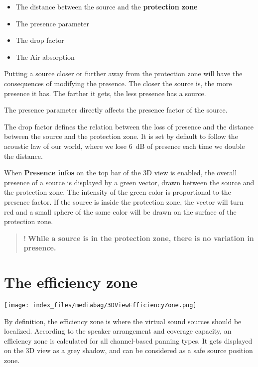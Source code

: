 \documentclass[
  letterpaper,
  DIV=11,
  numbers=noendperiod]{scrreport}
\providecommand{\tightlist}{%
  \setlength{\itemsep}{0pt}\setlength{\parskip}{0pt}}\usepackage{longtable,booktabs,array}
\begin{document}
\begin{itemize}
\tightlist
\item
  The distance between the source and the \textbf{protection zone}
\item
  The presence parameter
\item
  The drop factor
\item
  The Air absorption
\end{itemize}

Putting a source closer or further away from the protection zone will
have the consequences of modifying the presence. The closer the source
is, the more presence it has. The farther it gets, the less presence has
a source.

The presence parameter directly affects the presence factor of the
source.

The drop factor defines the relation between the loss of presence and
the distance between the source and the protection zone. It is set by
default to follow the acoustic law of our world, where we lose 6~dB of
presence each time we double the distance.

When \textbf{Presence infos} on the top bar of the 3D view is enabled,
the overall presence of a source is displayed by a green vector, drawn
between the source and the protection zone. The intensity of the green
color is proportional to the presence factor. If the source is inside
the protection zone, the vector will turn red and a small sphere of the
same color will be drawn on the surface of the protection zone.

\begin{quote}
! \textbf{While a source is in the protection zone, there is no
variation in presence.}
\end{quote}

\hypertarget{the-efficiency-zone}{%
\section{The efficiency zone}\label{the-efficiency-zone}}

\texttt{[image: index\_files/mediabag/3DViewEfficiencyZone.png]}

By definition, the efficiency zone is where the virtual sound sources
should be localized. According to the speaker arrangement and coverage
capacity, an efficiency zone is calculated for all channel-based panning
types. It gets displayed on the 3D view as a grey shadow, and can be
considered as a safe source position zone.
\end{document}
